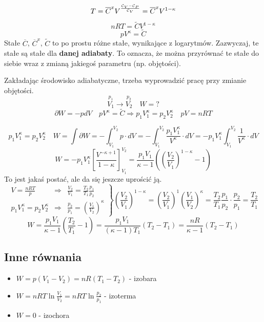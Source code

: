 \documentclass{../notatki}
\begin{document}
$$
T = \overline{C}^x V ^ {\frac{\mathcal{C}_V - \mathcal{C}_P}{\mathcal{C}_V}} =
\overline{C}^x V^{1 - \kappa}
$$
$$
nRT = \tilde{C} V^{1 - \kappa}
$$
$$
pV^{\kappa} = \tilde{C}
$$
Stałe $\overline{C}$, $\overline{C}^x$, $\tilde{C}$ to po prostu różne stałe,
wynikające z logarytmów. Zazwyczaj, te stałe są stałe dla
\textbf{danej adiabaty}. To oznacza, że można przyrównać te stałe do siebie
wraz z zmianą jakiegoś parametru (np. objętości).

\begin{examplebox}
  Zakładając środowisko adiabatyczne, trzeba wyprowadzić pracę przy zmianie
  objętości.
  $$
  \stackrel{p_1}{V_1} \to \stackrel{p_2}{V_2} \quad W = ?
  $$
  $$
  \partial W = -pdV \quad pV^\kappa = \tilde{C} \Rightarrow
  p_1V_1^\kappa = p_2V_2^\kappa \quad pV = nRT
  $$

  \vspace{1em}
  $$
  p_1V_1^\kappa = p_2V_2^\kappa \quad W = \int \partial W = -
  \int_{V_1}^{V_2} p \cdot dV = - \int_{V_1}^{V_2}
  \frac{p_1V_1^\kappa}{V^\kappa} \cdot dV = - p_1V_1^\kappa \int_{V_1}^{V_2}
  \frac{1}{V^\kappa} \cdot dV
  $$
  $$
  W = -p_1V_1^\kappa \left[\frac{V^{-\kappa + 1}}{1 -
  \kappa}\right]^{V_2}_{V_1} = \frac{p_1V_1}{\kappa - 1}
  \left(\left(\frac{V_2}{V_1}\right)^{1 - \kappa} - 1 \right)
  $$
  To jest jakaś postać, ale da się jeszcze uprościć ją.
  $$
  \left.
  \begin{aligned}
    V = \frac{nRT}{p} &\Rightarrow& \frac{V_2}{V_1} = \frac{T_2}{T_1}
    \frac{p_1}{p_2} \\
    p_1V_1^\kappa = p_2V_2^\kappa &\Rightarrow& \frac{p_2}{p_1} =
    \left(\frac{V_1}{V_2}\right)^\kappa
  \end{aligned}
  \right\rbrace \left(\frac{V_2}{V_1}\right)^{1 - \kappa} =
  \left(\frac{V_2}{V_1}\right)^{1} \left(\frac{V_1}{V_2}\right)^\kappa =
  \frac{T_2}{T_1} \frac{p_1}{p_2} \cdot  \frac{p_2}{p_1} = \frac{T_2}{T_1}
  $$
  $$
  W = \frac{p_1V_1}{\kappa - 1}\left(\frac{T_2}{T_1} - 1\right) =
  \frac{p_1V_1}{(\kappa - 1)T_1} (T_2 - T_1) =
  \frac{nR}{\kappa - 1}(T_2 - T_1)
  $$
\end{examplebox}

\subsection{Inne równania}

\begin{itemize}
  \item $W = p(V_1 - V_2) = nR(T_1 - T_2)$ - izobara
  \item $W = nRT \ln \frac{V_1}{V_2} = nRT \ln \frac{p_2}{p_1}$ - izoterma
  \item $W = 0$ - izochora
\end{itemize}
\end{document}
